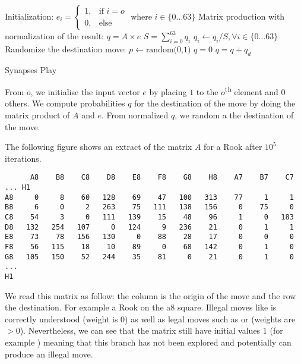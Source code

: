\documentclass[a4paper,10pt]{article}
\begin{document}
\begin{algorithm}
  \label{alg:SynapsesPlay}
  \DontPrintSemicolon
  Initialization:\;
  $e_i =
  \begin{cases}
    1,& \text{if } i = o \\
    0,& \text{else}
  \end{cases} \text{ where } i \in \{0 \dotsc 63\}$\;
  Matrix production with normalization of the result:\;
  $q = A \times e$\;
  $S = \sum_{i=0}^{63}q_i$\;
  $q_i \gets q_i / S, \forall i \in \{0 \dotsc 63\}$\;
  Randomize the destination move:\;
  $p \gets \text{random(0,1)}$\;
  $q = 0$\;
  {
    $q = q + q_d$\;
       {
       }
  }
  \caption{Synapses Play}
\end{algorithm}

From $o$, we initialise the input vector $e$ by placing $1$ to the
$o$\textsuperscript{th} element and 0 others. We compute probabilities $q$ for
the destination of the move by doing the matrix product of $A$ and $e$. From
normalized $q$, we random a the destination of the move.

The following figure shows an extract of the matrix $A$ for a Rook after $10^5$
iterations.

\begin{verbatim}
      A8    B8    C8    D8    E8    F8    G8    H8    A7    B7    C7 ... H1
A8     0     8    60   128    69    47   100   313    77     1     1
B8     6     0     2   263    75   111   138   156     0    75     0
C8    54     3     0   111   139    15    48    96     1     0   183
D8   132   254   107     0   124     9   236    21     0     1     1
E8    73    78   156   130     0    88    28    17     0     0     0
F8    56   115    18    10    89     0    68   142     0     1     0
G8   105   150    52   244    35    81     0    21     0     1     0
...
H1
\end{verbatim}

We read this matrix as follow: the column is the origin of the move and the row
the destination. For example a Rook on the a8 square. Illegal moves like
 is correctly understood (weight is $0$) as well as legal moves
such as  or  (weights are $>0$). Nevertheless, we
can see that the matrix still have initial values $1$ (for example
) meaning that this branch has not been explored and potentially
can produce an illegal move.
\end{document}
